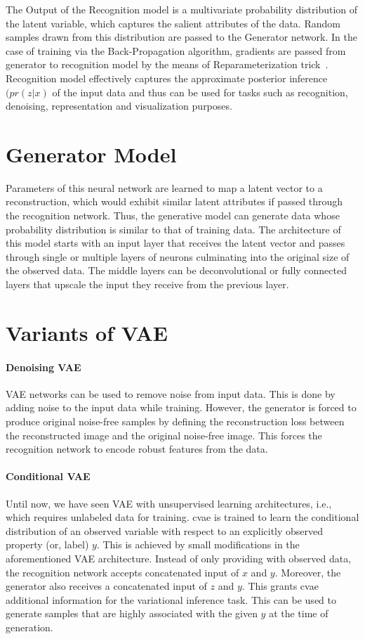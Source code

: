 The Output of the Recognition model is a multivariate probability distribution of the latent variable, which captures the salient attributes of the data.
Random samples drawn from this distribution are passed to the Generator network. In the case of training via the Back-Propagation algorithm, gradients are passed from generator to recognition model by the means of Reparameterization trick~\cite{Kingma2014AutoEncodingVB}.
Recognition model effectively captures the approximate posterior inference $(pr(z|x)$ of the input data and thus can be used for tasks such as recognition, denoising, representation and visualization purposes.

\section{Generator Model}
Parameters of this neural network are learned to map a latent vector to a reconstruction, which would exhibit similar latent attributes if passed through the recognition network.
Thus, the generative model can generate data whose probability distribution is similar to that of training data.
The architecture of this model starts with an input layer that receives the latent vector and passes through single or multiple layers of neurons culminating into the original size of the observed data.
The middle layers can be deconvolutional or fully connected layers that upscale the input they receive from the previous layer.

\section{Variants of VAE}
\paragraph{Denoising VAE}
VAE networks can be used to remove noise from input data.
This is done by adding noise to the input data while training.
However, the generator is forced to produce original noise-free samples by defining the reconstruction loss between the reconstructed image and the original noise-free image.
This forces the recognition network to encode robust features from the data.


\paragraph{Conditional VAE}\label{condi_vae}
Until now, we have seen VAE with unsupervised learning architectures, i.e., which requires unlabeled data for training.
\ac{cvae} is trained to learn the conditional distribution of an observed variable with respect to an explicitly observed property (or, label) $y$.
This is achieved by small modifications in the aforementioned VAE architecture.
Instead of only providing with observed data, the recognition network accepts concatenated input of $x$ and $y$.
Moreover, the generator also receives a concatenated input of $z$ and $y$.
This grants \ac{cvae} additional information for the variational inference task.
This can be used to generate samples that are highly associated with the given $y$ at the time of generation.

